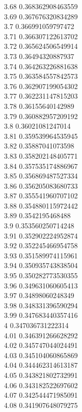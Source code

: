 {3.68	0.368362908463559\\
3.69	0.367676320834289\\
3.7	0.366991059797472\\
3.71	0.366307122613702\\
3.72	0.365624506549914\\
3.73	0.36494320887937\\
3.74	0.364263226881638\\
3.75	0.363584557842573\\
3.76	0.362907199054302\\
3.77	0.362231147815203\\
3.78	0.36155640142989\\
3.79	0.360882957209192\\
3.8	0.36021081247014\\
3.81	0.359539964535945\\
3.82	0.35887041073598\\
3.83	0.358202148405771\\
3.84	0.357535174886967\\
3.85	0.356869487527334\\
3.86	0.356205083680733\\
3.87	0.355541960707102\\
3.88	0.354880115972442\\
3.89	0.3542195468488\\
3.9	0.353560250714248\\
3.91	0.352902224952874\\
3.92	0.352245466954758\\
3.93	0.351589974115961\\
3.94	0.350935743838504\\
3.95	0.350282773530355\\
3.96	0.349631060605413\\
3.97	0.34898060248349\\
3.98	0.348331396590294\\
3.99	0.347683440357416\\
4	0.347036731222314\\
4.01	0.346391266628292\\
4.02	0.345747044024491\\
4.03	0.345104060865869\\
4.04	0.344462314613187\\
4.05	0.343821802732991\\
4.06	0.343182522697602\\
4.07	0.342544471985091\\
4.08	0.341907648079275\\
}
